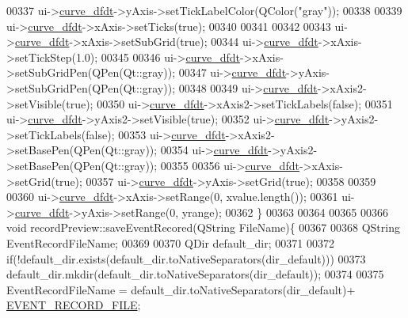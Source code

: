 \begin{DoxyCode}
00337   ui->\hyperlink{a00081_a43d24fa14d90cc27b310542e39dcdd1b}{curve\_dfdt}->yAxis->setTickLabelColor(QColor(\textcolor{stringliteral}{"gray"}));
00338 
00339   ui->\hyperlink{a00081_a43d24fa14d90cc27b310542e39dcdd1b}{curve\_dfdt}->xAxis->setTicks(\textcolor{keyword}{true});
00340 
00341 
00342 
00343   ui->\hyperlink{a00081_a43d24fa14d90cc27b310542e39dcdd1b}{curve\_dfdt}->xAxis->setSubGrid(\textcolor{keyword}{true});
00344   ui->\hyperlink{a00081_a43d24fa14d90cc27b310542e39dcdd1b}{curve\_dfdt}->xAxis->setTickStep(1.0);
00345 
00346   ui->\hyperlink{a00081_a43d24fa14d90cc27b310542e39dcdd1b}{curve\_dfdt}->xAxis->setSubGridPen(QPen(Qt::gray));
00347   ui->\hyperlink{a00081_a43d24fa14d90cc27b310542e39dcdd1b}{curve\_dfdt}->yAxis->setSubGridPen(QPen(Qt::gray));
00348 
00349   ui->\hyperlink{a00081_a43d24fa14d90cc27b310542e39dcdd1b}{curve\_dfdt}->xAxis2->setVisible(\textcolor{keyword}{true});
00350   ui->\hyperlink{a00081_a43d24fa14d90cc27b310542e39dcdd1b}{curve\_dfdt}->xAxis2->setTickLabels(\textcolor{keyword}{false});
00351   ui->\hyperlink{a00081_a43d24fa14d90cc27b310542e39dcdd1b}{curve\_dfdt}->yAxis2->setVisible(\textcolor{keyword}{true});
00352   ui->\hyperlink{a00081_a43d24fa14d90cc27b310542e39dcdd1b}{curve\_dfdt}->yAxis2->setTickLabels(\textcolor{keyword}{false});
00353   ui->\hyperlink{a00081_a43d24fa14d90cc27b310542e39dcdd1b}{curve\_dfdt}->xAxis2->setBasePen(QPen(Qt::gray));
00354   ui->\hyperlink{a00081_a43d24fa14d90cc27b310542e39dcdd1b}{curve\_dfdt}->yAxis2->setBasePen(QPen(Qt::gray));
00355 
00356    ui->\hyperlink{a00081_a43d24fa14d90cc27b310542e39dcdd1b}{curve\_dfdt}->xAxis->setGrid(\textcolor{keyword}{true});
00357    ui->\hyperlink{a00081_a43d24fa14d90cc27b310542e39dcdd1b}{curve\_dfdt}->yAxis->setGrid(\textcolor{keyword}{true});
00358 
00359 
00360   ui->\hyperlink{a00081_a43d24fa14d90cc27b310542e39dcdd1b}{curve\_dfdt}->xAxis->setRange(0, xvalue.length());
00361   ui->\hyperlink{a00081_a43d24fa14d90cc27b310542e39dcdd1b}{curve\_dfdt}->yAxis->setRange(0, yrange);
00362 \}
00363 
00364 
00365 
00366 \textcolor{keywordtype}{void} recordPreview::saveEventRecored(QString FileName)\{
00367 
00368     QString EventRecordFileName;
00369 
00370             QDir default\_dir;
00371 
00372             \textcolor{keywordflow}{if}(!default\_dir.exists(default\_dir.toNativeSeparators(dir\_default)))
00373                 default\_dir.mkdir(default\_dir.toNativeSeparators(dir\_default));
00374 
00375             EventRecordFileName = default\_dir.toNativeSeparators(dir\_default)+ 
      \hyperlink{a00110_a8d4ad2cd60e024f6e0f37dbac40768a1}{EVENT\_RECORD\_FILE};

\end{DoxyCode}
